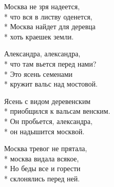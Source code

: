 \begin{minipage}{\linewidth}
Москва не зря надеется,\\*
что вся в листву оденется,\\*
Москва найдет для деревца\\*
хоть краешек земли.\\
\end{minipage}\par\medskip\nobreak

\medskip

\begin{minipage}{\linewidth}
\hspace*{1.5em}Александра, александра,\\*
\hspace*{1.5em}что там вьется перед нами?\\*
\hspace*{1.5em}Это ясень семенами\\*
\hspace*{1.5em}кружит вальс над мостовой.\\
\end{minipage}\par\medskip\nobreak

\medskip

\begin{minipage}{\linewidth}
\hspace*{1.5em}Ясень с видом деревенским\\*
\hspace*{1.5em}приобщился к вальсам венским.\\*
\hspace*{1.5em}Он пробьется, александра,\\*
\hspace*{1.5em}он надышится москвой.\\
\end{minipage}\par\medskip\nobreak

\medskip

\begin{minipage}{\linewidth}
Москва тревог не прятала,\\*
москва видала всякое,\\*
Но беды все и горести\\*
склонялись перед ней.\\
\end{minipage}\par\medskip\nobreak

\medskip

